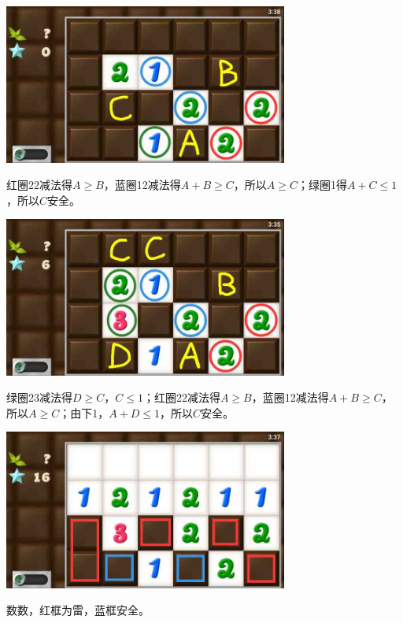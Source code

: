 \subsection{} %
\begin{center}
    \includegraphics[width=0.7\textwidth]{puzzlelow/203-1.jpg}
\end{center}
红圈22减法得$A\ge B$，蓝圈12减法得$A+B\ge C$，所以$A\ge C$；绿圈1得$A+C\le 1$，所以$C$安全。
\begin{center}
    \includegraphics[width=0.7\textwidth]{puzzlelow/203-2.jpg}
\end{center}
绿圈23减法得$D\ge C$，$C\le 1$；红圈22减法得$A\ge B$，蓝圈12减法得$A+B\ge C$，所以$A\ge C$；由下1，$A+D\le 1$，所以$C$安全。
\begin{center}
    \includegraphics[width=0.7\textwidth]{puzzlelow/203-3.jpg}
\end{center}
数数，红框为雷，蓝框安全。

